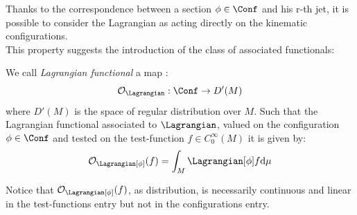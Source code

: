 \documentclass[Main]{subfiles}
\begin{document}
	
	Thanks to the correspondence between a section $\phi \in \Conf$ and his r-th jet, it is possible to consider the Lagrangian as acting directly on the kinematic configurations.
	\\
	This property suggests the introduction of the class of associated functionals:
	\begin{definition}\label{Def:LagrangianFunctionals}
		We call \emph{Lagrangian functional} a map :
		\begin{displaymath}
			\mathcal{O}_\Lagrangian : \Conf \rightarrow D'(M) 
		\end{displaymath}			
		where  $D'(M)$ is the space of regular distribution over $M$.%
			Such that the Lagrangian functional associated to $\Lagrangian$, valued on the configuration $\phi \in \Conf$ and tested on the test-function $f \in C^\infty_0(M)$ it is given by:
		\begin{displaymath}
			\mathcal{O}_\Lagrangian [\phi] (f) = \int_M \Lagrangian [\phi] f \textrm{d}\mu
		\end{displaymath}		
	\end{definition}	
	Notice that $\mathcal{O}_\Lagrangian [\phi] (f)$, as distribution, is necessarily continuous and linear in the test-functions entry  but not in the configurations entry.	
	
\end{document}
